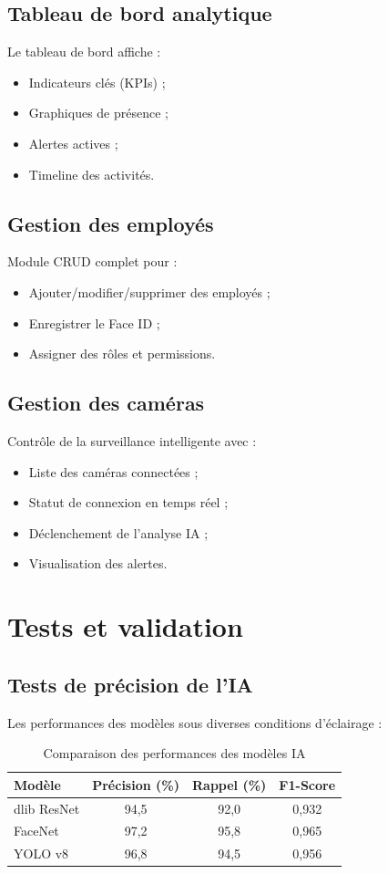 \documentclass[12pt,a4paper]{report}
\numberwithin{figure}{chapter}
\numberwithin{table}{chapter}
\begin{document}
\subsection{Tableau de bord analytique}
Le tableau de bord affiche :
\begin{itemize}
  \item Indicateurs clés (KPIs) ;
  \item Graphiques de présence ;
  \item Alertes actives ;
  \item Timeline des activités.
\end{itemize}

\subsection{Gestion des employés}
Module CRUD complet pour :
\begin{itemize}
  \item Ajouter/modifier/supprimer des employés ;
  \item Enregistrer le Face ID ;
  \item Assigner des rôles et permissions.
\end{itemize}

\subsection{Gestion des caméras}
Contrôle de la surveillance intelligente avec :
\begin{itemize}
  \item Liste des caméras connectées ;
  \item Statut de connexion en temps réel ;
  \item Déclenchement de l'analyse IA ;
  \item Visualisation des alertes.
\end{itemize}

\section{Tests et validation}

\subsection{Tests de précision de l'IA}
Les performances des modèles sous diverses conditions d'éclairage :

\begin{table}[H]
  \centering
  \caption{Comparaison des performances des modèles IA}
  \label{tab:perf_ia}
  \begin{tabular}{lccc}
    \toprule
    \textbf{Modèle} & \textbf{Précision (\%)} & \textbf{Rappel (\%)} & \textbf{F1-Score} \\
    \midrule
    dlib ResNet & 94,5 & 92,0 & 0,932 \\
    FaceNet & 97,2 & 95,8 & 0,965 \\
    YOLO v8 & 96,8 & 94,5 & 0,956 \\
    \bottomrule
  \end{tabular}
\end{table}
\end{document}
